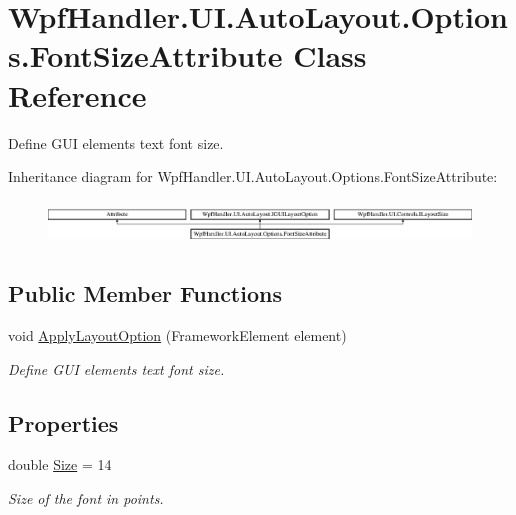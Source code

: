 \hypertarget{class_wpf_handler_1_1_u_i_1_1_auto_layout_1_1_options_1_1_font_size_attribute}{}\section{Wpf\+Handler.\+U\+I.\+Auto\+Layout.\+Options.\+Font\+Size\+Attribute Class Reference}
\label{class_wpf_handler_1_1_u_i_1_1_auto_layout_1_1_options_1_1_font_size_attribute}


Define G\+UI element\textquotesingle{}s text font size.  


Inheritance diagram for Wpf\+Handler.\+U\+I.\+Auto\+Layout.\+Options.\+Font\+Size\+Attribute\+:\begin{figure}[H]
\begin{center}
\leavevmode
\includegraphics[height=1.177708cm]{d8/d18/class_wpf_handler_1_1_u_i_1_1_auto_layout_1_1_options_1_1_font_size_attribute}
\end{center}
\end{figure}
\subsection*{Public Member Functions}
\begin{DoxyCompactItemize}
\item 
void \mbox{\hyperlink{class_wpf_handler_1_1_u_i_1_1_auto_layout_1_1_options_1_1_font_size_attribute_abd93e70e5419e81c4dfdd9b5d1f35343}{Apply\+Layout\+Option}} (Framework\+Element element)
\begin{DoxyCompactList}\small\item\em Define G\+UI element\textquotesingle{}s text font size. \end{DoxyCompactList}\end{DoxyCompactItemize}
\subsection*{Properties}
\begin{DoxyCompactItemize}
\item 
double \mbox{\hyperlink{class_wpf_handler_1_1_u_i_1_1_auto_layout_1_1_options_1_1_font_size_attribute_a202d0e2cf999904e0a9391cab646bbfc}{Size}} = 14
\begin{DoxyCompactList}\small\item\em Size of the font in points. \end{DoxyCompactList}\end{DoxyCompactItemize}



